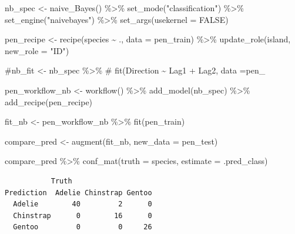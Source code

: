 \documentclass[
  letterpaper,
  DIV=11,
  numbers=noendperiod]{scrreprt}
\newenvironment{Shaded}{\begin{snugshade}}{\end{snugshade}}
\newcommand{\AttributeTok}[1]{\textcolor[rgb]{0.40,0.45,0.13}{#1}}
\newcommand{\CommentTok}[1]{\textcolor[rgb]{0.37,0.37,0.37}{#1}}
\newcommand{\ConstantTok}[1]{\textcolor[rgb]{0.56,0.35,0.01}{#1}}
\newcommand{\FunctionTok}[1]{\textcolor[rgb]{0.28,0.35,0.67}{#1}}
\newcommand{\NormalTok}[1]{\textcolor[rgb]{0.00,0.23,0.31}{#1}}
\newcommand{\OtherTok}[1]{\textcolor[rgb]{0.00,0.23,0.31}{#1}}
\newcommand{\SpecialCharTok}[1]{\textcolor[rgb]{0.37,0.37,0.37}{#1}}
\newcommand{\StringTok}[1]{\textcolor[rgb]{0.13,0.47,0.30}{#1}}
\begin{document}
\begin{Shaded}
\begin{Highlighting}[]
\NormalTok{nb\_spec }\OtherTok{\textless{}{-}} \FunctionTok{naive\_Bayes}\NormalTok{() }\SpecialCharTok{\%\textgreater{}\%} 
  \FunctionTok{set\_mode}\NormalTok{(}\StringTok{"classification"}\NormalTok{) }\SpecialCharTok{\%\textgreater{}\%} 
  \FunctionTok{set\_engine}\NormalTok{(}\StringTok{"naivebayes"}\NormalTok{) }\SpecialCharTok{\%\textgreater{}\%} 
  \FunctionTok{set\_args}\NormalTok{(}\AttributeTok{usekernel =} \ConstantTok{FALSE}\NormalTok{)  }


\NormalTok{pen\_recipe }\OtherTok{\textless{}{-}} 
  \FunctionTok{recipe}\NormalTok{(species }\SpecialCharTok{\textasciitilde{}}\NormalTok{ ., }\AttributeTok{data =}\NormalTok{ pen\_train) }\SpecialCharTok{\%\textgreater{}\%} 
  \FunctionTok{update\_role}\NormalTok{(island,  }\AttributeTok{new\_role =} \StringTok{"ID"}\NormalTok{)}


\CommentTok{\#nb\_fit \textless{}{-} nb\_spec \%\textgreater{}\% }
\CommentTok{\#  fit(Direction \textasciitilde{} Lag1 + Lag2, data =pen\_}

\NormalTok{pen\_workflow\_nb }\OtherTok{\textless{}{-}} \FunctionTok{workflow}\NormalTok{() }\SpecialCharTok{\%\textgreater{}\%}
  \FunctionTok{add\_model}\NormalTok{(nb\_spec) }\SpecialCharTok{\%\textgreater{}\%}
  \FunctionTok{add\_recipe}\NormalTok{(pen\_recipe)}

\NormalTok{fit\_nb }\OtherTok{\textless{}{-}}\NormalTok{ pen\_workflow\_nb }\SpecialCharTok{\%\textgreater{}\%} \FunctionTok{fit}\NormalTok{(pen\_train)}
\end{Highlighting}
\end{Shaded}

\begin{Shaded}
\begin{Highlighting}[]
\NormalTok{compare\_pred }\OtherTok{\textless{}{-}} \FunctionTok{augment}\NormalTok{(fit\_nb, }\AttributeTok{new\_data =}\NormalTok{ pen\_test) }

\NormalTok{compare\_pred }\SpecialCharTok{\%\textgreater{}\%} \FunctionTok{conf\_mat}\NormalTok{(}\AttributeTok{truth =}\NormalTok{ species, }\AttributeTok{estimate =}\NormalTok{ .pred\_class)}
\end{Highlighting}
\end{Shaded}

\begin{verbatim}
           Truth
Prediction  Adelie Chinstrap Gentoo
  Adelie        40         2      0
  Chinstrap      0        16      0
  Gentoo         0         0     26
\end{verbatim}
\end{document}
